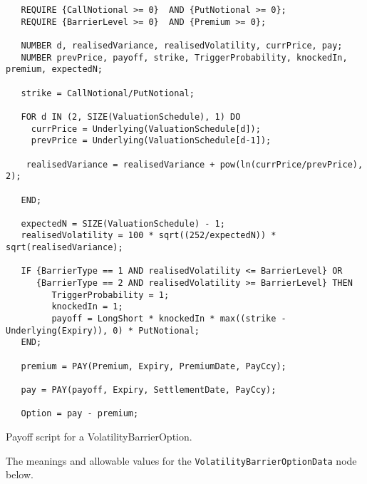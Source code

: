 \begin{listing}[hbt]
\begin{verbatim}
   REQUIRE {CallNotional >= 0}  AND {PutNotional >= 0};
   REQUIRE {BarrierLevel >= 0}  AND {Premium >= 0};

   NUMBER d, realisedVariance, realisedVolatility, currPrice, pay;
   NUMBER prevPrice, payoff, strike, TriggerProbability, knockedIn, premium, expectedN;

   strike = CallNotional/PutNotional;

   FOR d IN (2, SIZE(ValuationSchedule), 1) DO
     currPrice = Underlying(ValuationSchedule[d]);
     prevPrice = Underlying(ValuationSchedule[d-1]);

    realisedVariance = realisedVariance + pow(ln(currPrice/prevPrice), 2);

   END;

   expectedN = SIZE(ValuationSchedule) - 1;
   realisedVolatility = 100 * sqrt((252/expectedN)) * sqrt(realisedVariance);

   IF {BarrierType == 1 AND realisedVolatility <= BarrierLevel} OR 
      {BarrierType == 2 AND realisedVolatility >= BarrierLevel} THEN
         TriggerProbability = 1;
         knockedIn = 1;
         payoff = LongShort * knockedIn * max((strike - Underlying(Expiry)), 0) * PutNotional;
   END;

   premium = PAY(Premium, Expiry, PremiumDate, PayCcy);

   pay = PAY(payoff, Expiry, SettlementDate, PayCcy);

   Option = pay - premium;
\end{verbatim}
\caption{Payoff script for a VolatilityBarrierOption.}
\label{lst:fxvol_barrier_option}
\end{listing}

The meanings and allowable values for the \lstinline!VolatilityBarrierOptionData! node below.

